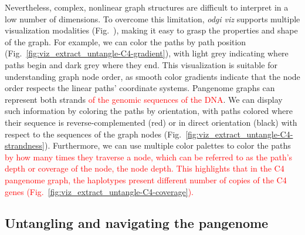 \documentclass{bioinfo}
\newcommand{\REVIEWED}[1]{{\textcolor{Red}{#1}}}
\begin{document}
Nevertheless, complex, nonlinear graph structures are difficult to interpret in a low number of dimensions.
To overcome this limitation, \textit{odgi viz} supports multiple visualization modalities (Fig.~), making it easy to grasp the properties and shape of the graph.
For example, we can color the paths by path position (Fig.~\ref{fig:viz_extract_untangle-C4-gradient}), with light grey indicating where paths begin and dark grey where they end.
This visualization is suitable for understanding graph node order, as smooth color gradients indicate that the node order respects the linear paths' coordinate systems.
Pangenome graphs can represent both strands \REVIEWED{of the genomic sequences of the DNA}.
We can display such information by coloring the paths by orientation, with paths colored where their sequence is reverse-complemented (red) or in direct orientation (black) with respect to the sequences of the graph nodes (Fig.~\ref{fig:viz_extract_untangle-C4-strandness}).
Furthermore, we can use multiple color palettes to color the paths \REVIEWED{by how many times they traverse a node, which can be referred to as the path's depth or coverage of the node, the node depth.}
\REVIEWED{This highlights that in the C4 pangenome graph, the haplotypes present different number of copies of the C4 genes (Fig.~\ref{fig:viz_extract_untangle-C4-coverage}).}



\subsection{Untangling and navigating the pangenome}
\label{sec:untangle}

\end{document}
